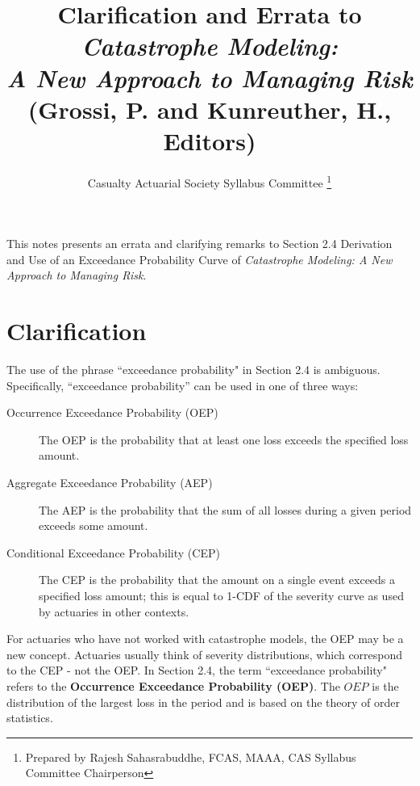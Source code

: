 \documentclass[]{article}
\title{Clarification and Errata to \\\textit{Catastrophe Modeling: \\A New Approach to Managing Risk} \\(Grossi, P. and Kunreuther, H., Editors)}
\author{Casualty Actuarial Society Syllabus Committee \thanks{Prepared by Rajesh Sahasrabuddhe, FCAS, MAAA, CAS Syllabus Committee Chairperson} } %
\begin{document}
\maketitle

\begin{abstract}

\end{abstract}
This notes presents an errata and clarifying remarks to Section 2.4 Derivation and Use of an Exceedance Probability Curve of \textit{Catastrophe Modeling: A New Approach to Managing Risk}.
\section{Clarification}
The use of the phrase ``exceedance probability" in Section 2.4 is ambiguous.  Specifically, “exceedance probability” can be used in one of three ways:
\begin{description}
\item[Occurrence Exceedance Probability (OEP)] The OEP is the probability that at least one loss exceeds the specified loss amount.
\item[Aggregate Exceedance Probability (AEP)] The AEP is the probability that the sum of all losses during a given period exceeds some amount.
\item[Conditional Exceedance Probability (CEP)] The CEP is the probability that the amount on a single event exceeds a specified loss amount; this is equal to 1-CDF of the severity curve as used by actuaries in other contexts.
\end{description}

For actuaries who have not worked with catastrophe models, the OEP may be a new concept.  Actuaries usually think of severity distributions, which correspond to the CEP - not the OEP.  In Section 2.4, the term ``exceedance probability" refers to the \textbf{Occurrence Exceedance Probability (OEP)}. The $OEP$ is the distribution of the largest loss in the period and is based on the theory of order statistics.
\end{document}
